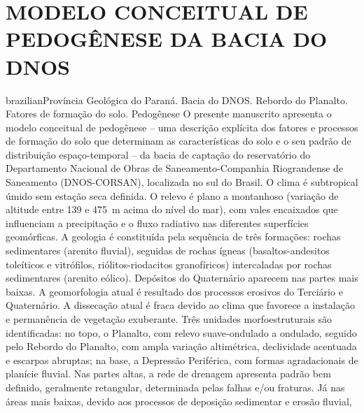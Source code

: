 \artigotrue
\chapter{MODELO CONCEITUAL DE PEDOGÊNESE DA BACIA DO DNOS}
\label{chap:chap03}


\def\ptkeys{Província Geológica do Paraná. Bacia do DNOS. Rebordo do Planalto. Fatores de formação do solo. 
Pedogênese}

\begin{chapterabstract}{brazilian}{\ptkeys}
O presente manuscrito apresenta o modelo conceitual de pedogênese -- uma descrição explícita dos fatores e 
processos de formação do solo que determinam as características do solo e o seu padrão de distribuição 
espaço-temporal -- da bacia de captação do reservatório do Departamento Nacional de Obras de 
Saneamento-Companhia Riograndense de Saneamento (DNOS-CORSAN), localizada no sul do Brasil. O clima é 
subtropical úmido sem estação seca definida. O relevo é plano a montanhoso (variação de altitude entre 139 e 
\SI{475}{\m} acima do nível do mar), com vales encaixados que influenciam a precipitação e o fluxo radiativo 
nas diferentes superfícies geomórficas. A geologia é constituída pela sequência de três formações: rochas 
sedimentares (arenito fluvial), seguidas de rochas ígneas (basaltos-andesitos toleíticos e vitrófilos, 
riólitos-riodacitos granofíricos) intercaladas por rochas sedimentares (arenito eólico). Depósitos do 
Quaternário aparecem nas partes mais baixas. A geomorfologia atual é resultado dos processos erosivos do 
Terciário e Quaternário. A dissecação atual é fraca devido ao clima que favorece a instalação e permanência de 
vegetação exuberante. Três unidades morfoestruturais são identificadas: no topo, o Planalto, com relevo 
suave-ondulado a ondulado, seguido pelo Rebordo do Planalto, com ampla variação altimétrica, declividade 
acentuada e escarpas abruptas; na base, a Depressão Periférica, com formas agradacionais de planície fluvial. 
Nas partes altas, a rede de drenagem apresenta padrão bem definido, geralmente retangular, determinada pelas 
falhas e/ou fraturas. Já nas áreas mais baixas, devido aos processos de deposição sedimentar e erosão fluvial, 

\end{chapterabstract}
